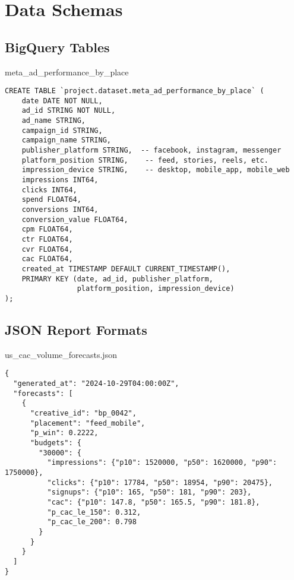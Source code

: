\documentclass[11pt,a4paper]{report}
\begin{document}
\chapter{Data Schemas}

\section{BigQuery Tables}

\begin{techbox}{meta\_ad\_performance\_by\_place}
\begin{verbatim}
CREATE TABLE `project.dataset.meta_ad_performance_by_place` (
    date DATE NOT NULL,
    ad_id STRING NOT NULL,
    ad_name STRING,
    campaign_id STRING,
    campaign_name STRING,
    publisher_platform STRING,  -- facebook, instagram, messenger
    platform_position STRING,    -- feed, stories, reels, etc.
    impression_device STRING,    -- desktop, mobile_app, mobile_web
    impressions INT64,
    clicks INT64,
    spend FLOAT64,
    conversions INT64,
    conversion_value FLOAT64,
    cpm FLOAT64,
    ctr FLOAT64,
    cvr FLOAT64,
    cac FLOAT64,
    created_at TIMESTAMP DEFAULT CURRENT_TIMESTAMP(),
    PRIMARY KEY (date, ad_id, publisher_platform,
                 platform_position, impression_device)
);
\end{verbatim}
\end{techbox}

\section{JSON Report Formats}

\begin{techbox}{us\_cac\_volume\_forecasts.json}
\begin{verbatim}
{
  "generated_at": "2024-10-29T04:00:00Z",
  "forecasts": [
    {
      "creative_id": "bp_0042",
      "placement": "feed_mobile",
      "p_win": 0.2222,
      "budgets": {
        "30000": {
          "impressions": {"p10": 1520000, "p50": 1620000, "p90": 1750000},
          "clicks": {"p10": 17784, "p50": 18954, "p90": 20475},
          "signups": {"p10": 165, "p50": 181, "p90": 203},
          "cac": {"p10": 147.8, "p50": 165.5, "p90": 181.8},
          "p_cac_le_150": 0.312,
          "p_cac_le_200": 0.798
        }
      }
    }
  ]
}
\end{verbatim}
\end{techbox}
\end{document}
